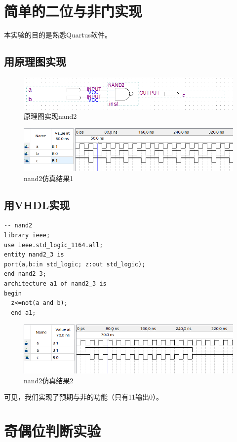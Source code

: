 \documentclass{article}
\begin{document}
\section{简单的二位与非门实现}
本实验的目的是熟悉Quartus软件。
\subsection{用原理图实现}
\begin{figure}[H]
\centering
\includegraphics[width=\textwidth]{nand2_layout}
\caption{原理图实现nand2}
\end{figure}
\begin{figure}[H]
\centering
\includegraphics[width=\textwidth]{nand2_output1}
\caption{nand2仿真结果1}
\end{figure}
\subsection{用VHDL实现}
\begin{lstlisting}
-- nand2 
library ieee;
use ieee.std_logic_1164.all;
entity nand2_3 is
port(a,b:in std_logic; z:out std_logic);
end nand2_3;
architecture a1 of nand2_3 is
begin 
  z<=not(a and b);
  end a1;
\end{lstlisting}
\begin{figure}[H]
\centering
\includegraphics[width=\textwidth]{nand2_output2}
\caption{nand2仿真结果2}
\end{figure}
可见，我们实现了预期与非的功能（只有11输出0）。
\section{奇偶位判断实验}
\end{document}
